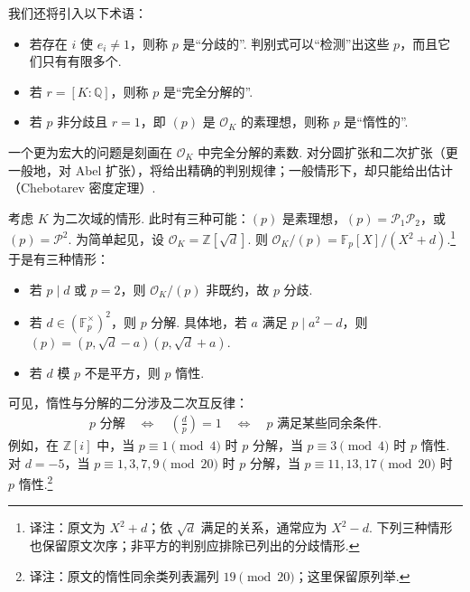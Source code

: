 我们还将引入以下术语：

\begin{itemize}

\item 若存在 $i$ 使 $e_i\ne1$，则称 $p$ 是``分歧的''. 判别式可以``检测''出这些 $p$，而且它们只有有限多个.

\item 若 $r=[K:\mathbb{Q}]$，则称 $p$ 是``完全分解的''.

\item 若 $p$ 非分歧且 $r=1$，即 $(p)$ 是 $\mathcal O_K$ 的素理想，则称 $p$ 是``惰性的''.

\end{itemize}

一个更为宏大的问题是刻画在 $\mathcal O_K$ 中完全分解的素数. 对分圆扩张和二次扩张（更一般地，对 Abel 扩张），将给出精确的判别规律；一般情形下，却只能给出估计（Chebotarev 密度定理）.

\begin{example*}

考虑 $K$ 为二次域的情形. 此时有三种可能：$(p)$ 是素理想，$(p)=\mathcal P_1\mathcal P_2$，或 $(p)=\mathcal P^2$. 为简单起见，设 $\mathcal O_K=\mathbb{Z}[\sqrt d]$. 则 $\mathcal O_K/(p)=\mathbb{F}_p[X]/(X^2+d)$.\footnote{译注：原文为 $X^2+d$；依 $\sqrt d$ 满足的关系，通常应为 $X^2-d$. 下列三种情形也保留原文次序；非平方的判别应排除已列出的分歧情形.} 于是有三种情形：

\begin{itemize}

\item 若 $p\mid d$ 或 $p=2$，则 $\mathcal O_K/(p)$ 非既约，故 $p$ 分歧.

\item 若 $d\in(\mathbb{F}_p^\times)^2$，则 $p$ 分解. 具体地，若 $a$ 满足 $p\mid a^2-d$，则 $(p)=(p,\sqrt d-a)(p,\sqrt d+a)$.

\item 若 $d$ 模 $p$ 不是平方，则 $p$ 惰性.

\end{itemize}

\end{example*}

可见，惰性与分解的二分涉及二次互反律：
\begin{align*}
p\text{ 分解}\quad\Longleftrightarrow\quad\left(\frac dp\right)=1\quad\Longleftrightarrow\quad p\text{ 满足某些同余条件}.
\end{align*}
例如，在 $\mathbb{Z}[i]$ 中，当 $p\equiv1\pmod4$ 时 $p$ 分解，当 $p\equiv3\pmod4$ 时 $p$ 惰性. 对 $d=-5$，当 $p\equiv1,3,7,9\pmod{20}$ 时 $p$ 分解，当 $p\equiv11,13,17\pmod{20}$ 时 $p$ 惰性.\footnote{译注：原文的惰性同余类列表漏列 $19\pmod{20}$；这里保留原列举.}

